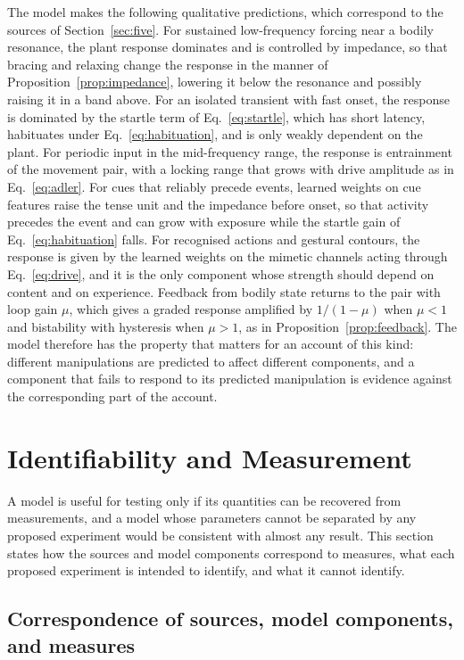 \documentclass[11pt]{article}
\theoremstyle{plain}
\theoremstyle{definition}
\begin{document}
The model makes the following qualitative predictions, which correspond to the sources of Section~\ref{sec:five}. For sustained low-frequency forcing near a bodily resonance, the plant response dominates and is controlled by impedance, so that bracing and relaxing change the response in the manner of Proposition~\ref{prop:impedance}, lowering it below the resonance and possibly raising it in a band above. For an isolated transient with fast onset, the response is dominated by the startle term of Eq.~\eqref{eq:startle}, which has short latency, habituates under Eq.~\eqref{eq:habituation}, and is only weakly dependent on the plant. For periodic input in the mid-frequency range, the response is entrainment of the movement pair, with a locking range that grows with drive amplitude as in Eq.~\eqref{eq:adler}. For cues that reliably precede events, learned weights on cue features raise the tense unit and the impedance before onset, so that activity precedes the event and can grow with exposure while the startle gain of Eq.~\eqref{eq:habituation} falls. For recognised actions and gestural contours, the response is given by the learned weights on the mimetic channels acting through Eq.~\eqref{eq:drive}, and it is the only component whose strength should depend on content and on experience. Feedback from bodily state returns to the pair with loop gain $\mu$, which gives a graded response amplified by $1/(1-\mu)$ when $\mu<1$ and bistability with hysteresis when $\mu>1$, as in Proposition~\ref{prop:feedback}. The model therefore has the property that matters for an account of this kind: different manipulations are predicted to affect different components, and a component that fails to respond to its predicted manipulation is evidence against the corresponding part of the account.

\section{Identifiability and Measurement}\label{sec:ident}

A model is useful for testing only if its quantities can be recovered from measurements, and a model whose parameters cannot be separated by any proposed experiment would be consistent with almost any result. This section states how the sources and model components correspond to measures, what each proposed experiment is intended to identify, and what it cannot identify.

\subsection{Correspondence of sources, model components, and measures}
\end{document}
